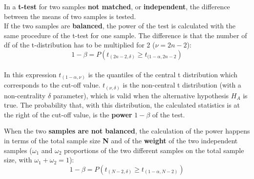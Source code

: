 \begin{frame}
  \vspace*{.25cm}
  In a \textbf{t-test} for two samples \textbf{not matched}, or \textbf{independent}, the difference between the means of two samples is tested.\\
  \vspace*{.25cm}
  If the two samples are \textbf{balanced}, the power of the test is calculated with the same procedure of the t-test for one sample. The difference is that the number of df of the t-distribution has to be multiplied for 2 ($\nu=2n-2$):
  $$1-\beta=P\left( t_{(2n-2,\delta)}\geq t_{(1-\alpha,2n-2}\right)$$\\
  In this expression $t_{(1-\alpha,\nu)}$ is the quantiles of the central t distribution which corresponds to the cut-off value. $t_{(\nu,\delta)}$ is the non-central t distribution (with a non-centrality $\delta$ parameter), which is valid when the alternative hypothesis $ H_A $ is true. The probability that, with this distribution, the calculated statistics is at the right of the cut-off value, is the \textbf{power} {\boldmath$1-\beta$} of the test.
\end{frame}

\begin{frame}
  \vspace*{.5cm}
  When the two \textbf{samples are not balanced}, the calculation of the power happens in terms of the total sample size \textbf{N} and of the \textbf{weight} of the two independent samples ($\omega_1$ and $\omega_2$ proportions of the two different samples on the total sample size, with $\omega_1+\omega_2=1$):\\
  \vspace*{.5cm}
  $$ 1 - \beta = P \left (t_{(N-2,\delta)} \geq t_{(1-\alpha,N-2)} \right) $$
\end{frame}


